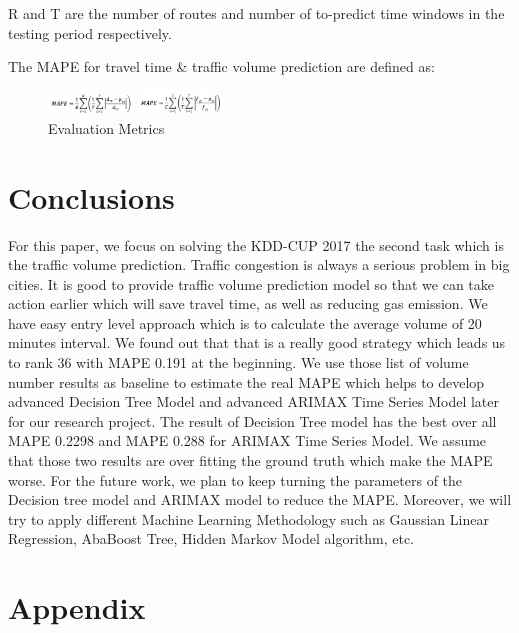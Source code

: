 \documentclass[journal, letterpaper]{IEEEtran}
\begin{document}
R and T are the number of routes and number of to-predict time windows in the testing period respectively.

The MAPE for travel time \& traffic volume prediction are defined as:

\begin{figure} [H]
  \centering
  \includegraphics[width=0.2\textwidth]{MAPE.png}
  
  \includegraphics[width=0.2\textwidth]{MAPE-2.png}
  \caption{Evaluation Metrics}
  \captionsetup{justification=centering}
  \label{fig:18}
\end{figure}

\section{Conclusions}
\large
For this paper, we focus on solving the KDD-CUP 2017 the second task which is the traffic volume prediction. Traffic congestion is always a serious problem in big cities. It is good to provide traffic volume prediction model so that we can take action earlier which will save travel time, as well as reducing gas emission. We have easy entry level approach which is to calculate the average volume of 20 minutes interval. We found out that that is a really good strategy which leads us to rank 36 with MAPE 0.191 at the beginning. We use those list of volume number results as baseline to estimate the real MAPE which helps to develop advanced Decision Tree Model and advanced ARIMAX Time Series Model later for our research project. The result of Decision Tree model has the best over all MAPE 0.2298 and MAPE 0.288 for ARIMAX Time Series Model. We assume that those two results are over fitting the ground truth which make the MAPE worse. For the future work, we plan to keep turning the parameters of the Decision tree model and ARIMAX model to reduce the MAPE. Moreover, we will try to apply different Machine Learning Methodology such as Gaussian Linear Regression, AbaBoost Tree, Hidden Markov Model algorithm, etc.

\section{Appendix}
\large
\end{document}
